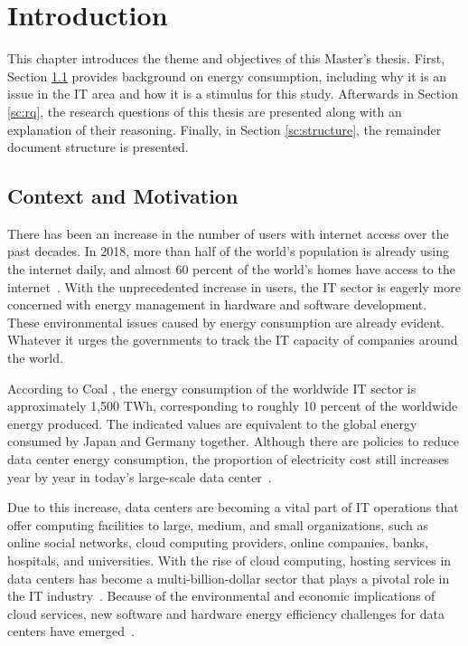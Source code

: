\newcommand{\novathesis}{\emph{novathesis}}
\newcommand{\novathesisclass}{\texttt{novathesis.cls}}


\chapter{Introduction}
\label{cha:introduction}

This chapter introduces the theme and objectives of this Master's thesis. First, Section \ref{sc:context} provides background on energy consumption, including why it is an issue in the IT area and how it is a stimulus for this study.
Afterwards in Section \ref{sc:rq}, the research questions of this thesis are presented along with an explanation of their reasoning. Finally, in Section \ref{sc:structure}, the remainder document structure is presented.

\section{Context and Motivation}
\label{sc:context}
There has been an increase in the number of users with internet access over the past decades. In 2018, more than half of the world's population is already using the internet daily, and almost 60 percent of the world's homes have access to the internet~\cite{2018stat}.
With the unprecedented increase in users, the IT sector is eagerly more concerned with energy management in hardware and software development. 
These environmental issues caused by energy consumption are already evident. Whatever it urges the governments to track the IT capacity of companies around the world\cite{gesi2008enabling,whitehead2014assessing,bilal2014trends,greenframework,dayarathna2015data}.

According to Coal \citeauthor{CCOAL18}, the energy consumption of the worldwide IT sector is approximately 1,500 TWh, corresponding to roughly 10 percent of the worldwide energy produced. The indicated values are equivalent to the global energy consumed by Japan and Germany together. Although there are policies to reduce data center energy consumption, the proportion of electricity cost still increases year by year in today's large-scale data center~\cite{trends}.

Due to this increase, data centers are becoming a vital part of IT operations that offer computing facilities to large, medium, and small organizations, such as online social networks, cloud computing providers, online companies, banks, hospitals, and universities. With the rise of cloud computing, hosting services in data centers has become a multi-billion-dollar sector that plays a pivotal role in the IT industry~\cite{dayarathna2015data,RONG2016674}.  Because of the environmental and economic implications of cloud services, new software and hardware energy efficiency challenges for data centers have emerged~\cite{dayarathna2015data}. 

